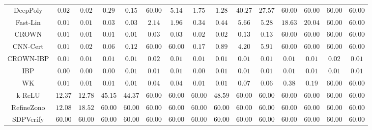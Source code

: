 \begin{table*}
{\begin{tabular}{c|c|c|c|c|c|c|c|c|c|c|c|c|c|c}
     DeepPoly &        $0.02$ &        $0.02$ &        $0.29$ &        $0.15$ &       $60.00$ &        $5.14$ &        $1.75$ &        $1.28$ &       $40.27$ &       $27.57$ &       $60.00$ &       $60.00$ &       $60.00$ &       $60.00$ \\
     Fast-Lin &        $0.01$ &        $0.01$ &        $0.03$ &        $0.03$ &        $2.14$ &        $1.96$ &        $0.34$ &        $0.44$ &        $5.66$ &        $5.28$ &       $18.63$ &       $20.04$ &       $60.00$ &       $60.00$ \\
        CROWN &        $0.01$ &        $0.01$ &        $0.01$ &        $0.01$ &        $0.03$ &        $0.03$ &        $0.02$ &        $0.02$ &        $0.13$ &        $0.13$ &       $60.00$ &       $60.00$ &       $60.00$ &       $60.00$ \\
     CNN-Cert &        $0.01$ &        $0.02$ &        $0.06$ &        $0.12$ &       $60.00$ &       $60.00$ &        $0.17$ &        $0.89$ &        $4.20$ &        $5.91$ &       $60.00$ &       $60.00$ &       $60.00$ &       $60.00$ \\
    CROWN-IBP &        $0.01$ &        $0.01$ &        $0.01$ &        $0.01$ &        $0.02$ &        $0.01$ &        $0.01$ &        $0.01$ &        $0.01$ &        $0.01$ &        $0.01$ &        $0.01$ &        $0.02$ &        $0.01$ \\
          IBP &        $0.00$ &        $0.00$ &        $0.00$ &        $0.01$ &        $0.01$ &        $0.01$ &        $0.00$ &        $0.01$ &        $0.01$ &        $0.01$ &        $0.01$ &        $0.01$ &        $0.01$ &        $0.01$ \\
           WK &        $0.01$ &        $0.01$ &        $0.01$ &        $0.01$ &        $0.04$ &        $0.04$ &        $0.01$ &        $0.01$ &        $0.07$ &        $0.06$ &        $0.38$ &        $0.19$ &       $60.00$ &       $60.00$ \\
       k-ReLU &       $12.37$ &       $12.78$ &       $45.15$ &       $44.37$ &       $60.00$ &       $60.00$ &       $60.00$ &       $48.59$ &       $60.00$ &       $60.00$ &       $60.00$ &       $60.00$ &       $60.00$ &       $60.00$ \\
   RefineZono &       $12.08$ &       $18.52$ &       $60.00$ &       $60.00$ &       $60.00$ &       $60.00$ &       $60.00$ &       $60.00$ &       $60.00$ &       $60.00$ &       $60.00$ &       $60.00$ &       $60.00$ &       $60.00$ \\
    SDPVerify &       $60.00$ &       $60.00$ &       $60.00$ &       $60.00$ &       $60.00$ &       $60.00$ &       $60.00$ &       $60.00$ &       $60.00$ &       $60.00$ &       $60.00$ &       $60.00$ &       $60.00$ &       $60.00$ \\

\end{tabular}}
\end{table*}
